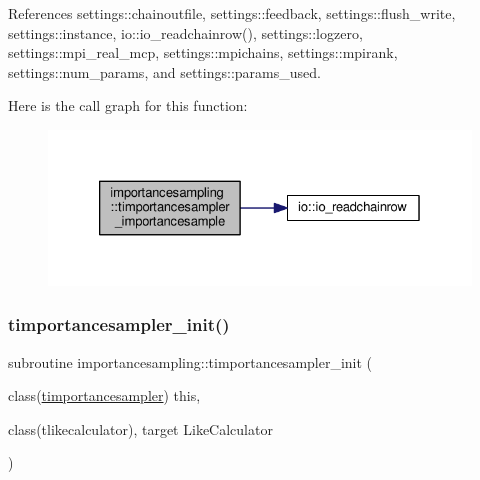 References settings\+::chainoutfile, settings\+::feedback, settings\+::flush\+\_\+write, settings\+::instance, io\+::io\+\_\+readchainrow(), settings\+::logzero, settings\+::mpi\+\_\+real\+\_\+mcp, settings\+::mpichains, settings\+::mpirank, settings\+::num\+\_\+params, and settings\+::params\+\_\+used.

Here is the call graph for this function\+:
\nopagebreak
\begin{figure}[H]
\begin{center}
\leavevmode
\includegraphics[width=326pt]{namespaceimportancesampling_a3f315e6a06f67ec1e9e1c310e410a10a_cgraph}
\end{center}
\end{figure}
\mbox{\label{namespaceimportancesampling_a3004e02389d8cf9b604c564fbfef6d9f}} 
\subsubsection{\texorpdfstring{timportancesampler\+\_\+init()}{timportancesampler\_init()}}
{\footnotesize\ttfamily subroutine importancesampling\+::timportancesampler\+\_\+init (\begin{DoxyParamCaption}\item[{class(\mbox{\hyperlink{structimportancesampling_1_1timportancesampler}{timportancesampler}})}]{this,  }\item[{class(tlikecalculator), target}]{Like\+Calculator }\end{DoxyParamCaption})\hspace{0.3cm}{\ttfamily [private]}}

\mbox{\label{namespaceimportancesampling_a39599f2e0377c272c415338ef81396df}} 

